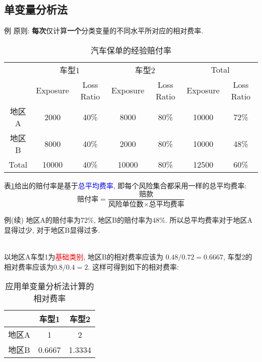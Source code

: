 \documentclass[professionalfont]{beamer}
\newcommand{\red}[1]{\textcolor{red}{#1}}
\newcommand{\blue}[1]{\textcolor{blue}{#1}}
\begin{document}
\subsection{单变量分析法}
\begin{frame}{例}
原则: \textbf{每次}仅计算\textbf{一个}分类变量的不同水平所对应的相对费率.
{\scriptsize
	\begin{table}[]
		\centering
		\caption{汽车保单的经验赔付率}
		\label{one_way}
		\begin{tabular}{ccccccc}
			\hline
			& \multicolumn{2}{c}{车型1} & \multicolumn{2}{c}{车型2} & \multicolumn{2}{c}{Total} \\
			& Exposure  & Loss Ratio  & Exposure  & Loss Ratio  & Exposure   & Loss Ratio   \\ \hline
			地区A   & 2000      & 40\%        & 8000      & 80\%        & 10000      & 72\%         \\
			地区B   & 8000       & 40\%        & 2000      & 80\%        & 10000       & 48\%         \\
			Total & 10000      & 40\%        & 10000     & 80\%        & 12500      & 60\%         \\ \hline
		\end{tabular}
	\end{table}}
表\ref{one_way}给出的赔付率是基于\blue{总平均费率},  即每个风险集合都采用一样的总平均费率: $$\text{赔付率}=\frac{\text{赔款}}{\text{风险单位数}\times\text{总平均费率}}$$
\end{frame}
\begin{frame}{例(续)}
地区A的赔付率为72\%, 地区B的赔付率为48\%. 所以总平均费率对于地区A显得过少, 对于地区B显得过多. \\

~

以地区A车型1为\red{基础类别}, 地区B的相对费率应该为 $0.48/0.72=0.6667$, 车型2的相对费率应该为$0.8/0.4=2$. 这样可得到如下的相对费率: 
\begin{table}[]
	\centering
	\caption{应用单变量分析法计算的相对费率}
	\label{one_way_result}
	\begin{tabular}{c|cc}
		\hline
		& 车型1    & 车型2    \\ \hline
		地区A & 1      & 2      \\
		地区B & 0.6667 & 1.3334 \\ \hline
	\end{tabular}
\end{table}
\end{frame}
\end{document}
